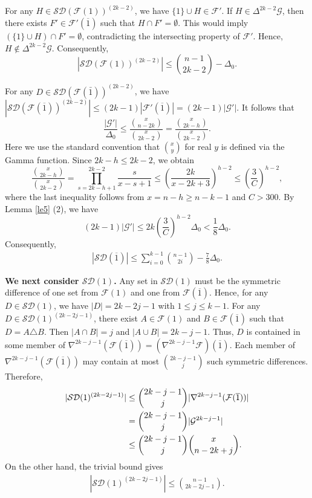\documentclass[11pt]{article}
\numberwithin{equation}{section}
\begin{document}
For any $H\in \mathcal{SD}(\mathcal{F}(1))^{(2k-2)}$, we have ${\{1}\} \cup H \in \mathcal{F}'$. If $H\in \Delta^{2k-2}{\mathcal{G}}$, then there exists $F' \in \mathcal{F}'(\overline{1})$ such that $H\cap F'=\emptyset$. This would imply  $({\{1}\} \cup H ) \cap  F'=\emptyset$, contradicting the intersecting property of $\mathcal{F}'$.
        Hence, $H\notin \Delta^{2k-2}{\mathcal{G}}$.
        Consequently, 
	$$|\mathcal{SD}(\mathcal{F}(1))^{(2k-2)}|\le \binom{n-1}{2k-2}-\Delta_0.$$

For any $D\in \mathcal{SD}(\mathcal{F}(\bar{1}))^{(2k-2)}$,  we have  	$|\mathcal{SD}(\mathcal{F}(\overline{1}))^{(2k-2)}|\le (2k-1)|\mathcal{F}'(\overline{1})|=(2k-1)|\mathcal{G}'|.$
It follows that
$$
\frac{|\mathcal{G}'|}{\Delta_0}
\le \frac{\binom{x}{n-2k}}{\binom{x}{2k-2}}
= \frac{\binom{x}{2k-h}}{\binom{x}{2k-2}}.
$$
Here we use the standard convention that $\binom{x}{y}$ for real $y$ is defined via the Gamma function.  
Since $2k-h\le 2k-2$, we obtain
$$
\frac{\binom{x}{2k-h}}{\binom{x}{2k-2}}
= \prod_{s=2k-h+1}^{2k-2}\frac{s}{x-s+1}
\le \left(\frac{2k}{x-2k+3}\right)^{h-2}
\le \left(\frac{3}{C}\right)^{h-2},
$$
where the last inequality follows from $x=n-h\geq n-k-1$ and $C>300$.
By Lemma \ref{le5} (2), we have
$$
(2k-1)|\mathcal{G}'|
\le 2k\left(\frac{3}{C}\right)^{h-2}\Delta_0
< \frac{1}{8}\Delta_0. 
$$
Consequently,
\begin{align}
|\mathcal{SD}(\overline{1})|
\le \sum_{i=0}^{k-1}\binom{n-1}{2i}
-\frac{7}{8}\Delta_0. \label{45}
\end{align}

\textbf{We next consider $\mathcal{SD}(1)$.}
Any set in $\mathcal{SD}(1)$ must be the symmetric difference of one set from $\mathcal{F}(1)$ and one from $\mathcal{F}(\overline{1})$.
Hence, for any $D\in \mathcal{SD}(1)$,  we have $|D|=2k-2j-1$ with $1\le j\le k-1$. 
For any $D \in \mathcal{SD}(1)^{(2k-2j-1)}$, there exist $A \in \mathcal{F}(1)$ and $B \in \mathcal{F}(\overline{1})$ such that $D = A \triangle B$. Then  $|A\cap B|=j$ and  $|A\cup B|=2k-j-1$. Thus, $D$ is contained in some member of $\nabla^{2k-j-1}(\mathcal{F}(\overline{1}))=(\nabla^{2k-j-1}\mathcal{F})(\overline{1})$.  Each member of $\nabla^{2k-j-1}(\mathcal{F}(\overline{1}))$ may contain at most $\binom{2k-j-1}{j}$ such symmetric differences. 
Therefore, 
 \begin{align}
 |\mathcal{SD}(1)^{(2k-2j-1)}|&\le \binom{2k-j-1}{j}|\nabla^{2k-j-1}(\mathcal{F}(\overline{1}))| \notag\\ &=\binom{2k-j-1}{j}|\mathcal{G}^{2k-j-1}|\notag\\
&\le \binom{2k-j-1}{j}\binom{x}{n-2k+j}.\label{46}
 \end{align}
On the other hand, the trivial bound gives
\begin{align}
 |\mathcal{SD}(1)^{(2k-2j-1)}|\le 
 \binom{n-1}{2k-2j-1}.\label{47}
 \end{align}
\end{document}
